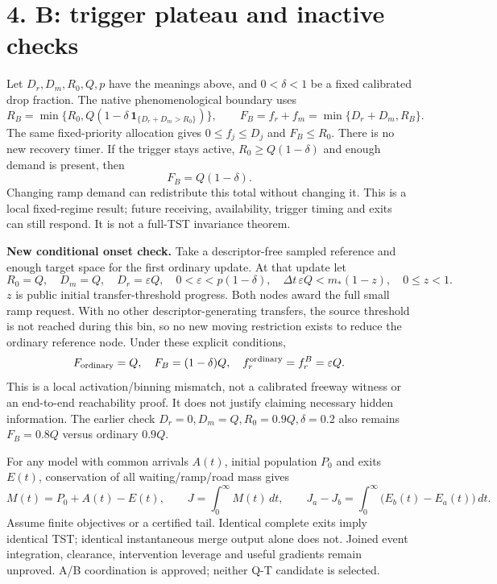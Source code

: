 \documentclass[11pt,a4paper]{article}
\begin{document}
\newpage
\section*{4. B: trigger plateau and inactive checks}
Let $D_r,D_m,R_0,Q,p$ have the meanings above, and $0<\delta<1$ be a fixed
calibrated drop fraction. The native phenomenological boundary uses
\begin{equation}
 R_B=\min\{R_0,Q(1-\delta\,\mathbf1_{\{D_r+D_m>R_0\}})\},
 \qquad F_B=f_r+f_m=\min\{D_r+D_m,R_B\}.
\end{equation}
The same fixed-priority allocation gives $0\le f_j\le D_j$ and $F_B\le R_0$.
There is no new recovery timer. If the trigger stays active, $R_0\ge Q(1-\delta)$
and enough demand is present, then
\begin{equation}
 F_B=Q(1-\delta).
\end{equation}
Changing ramp demand can redistribute this total without changing it. This is
a local fixed-regime result; future receiving, availability, trigger timing
and exits can still respond. It is not a full-TST invariance theorem.

\textbf{New conditional onset check.} Take a descriptor-free sampled reference
and enough target space for the first ordinary update. At that update let
\begin{equation}
 R_0=Q,\quad D_m=Q,\quad D_r=\varepsilon Q,\quad
 0<\varepsilon<p(1-\delta),\quad
 \Delta t\,\varepsilon Q<m_*(1-z),\quad 0\le z<1.
\end{equation}
$z$ is public initial transfer-threshold progress. Both nodes award the full
small ramp request. With no other descriptor-generating transfers, the source
threshold is not reached during this bin, so no new moving restriction exists
to reduce the ordinary reference node. Under these explicit conditions,
\begin{equation}
 F_{\rm ordinary}=Q,\quad F_B=(1-\delta)Q,\quad
 f_r^{\rm ordinary}=f_r^B=\varepsilon Q.
\end{equation}
This is a local activation/binning mismatch, not a calibrated freeway witness
or an end-to-end reachability proof. It does not justify claiming necessary
hidden information. The earlier check $D_r=0,D_m=Q,R_0=0.9Q,\delta=0.2$
also remains $F_B=0.8Q$ versus ordinary $0.9Q$.

For any model with common arrivals $A(t)$, initial population $P_0$ and exits
$E(t)$, conservation of all waiting/ramp/road mass gives
\begin{equation}
 M(t)=P_0+A(t)-E(t),\qquad
 J=\int_0^\infty M(t)\,dt,\qquad
 J_a-J_b=\int_0^\infty\bigl(E_b(t)-E_a(t)\bigr)\,dt.
\end{equation}
Assume finite objectives or a certified tail. Identical complete exits imply
identical TST; identical instantaneous merge output alone does not. Joined
event integration, clearance, intervention leverage and useful gradients remain
unproved. A/B coordination is approved; neither Q-T candidate is selected.
\end{document}
